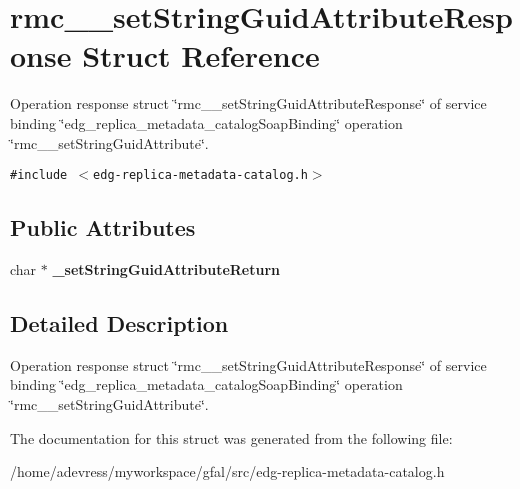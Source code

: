 \section{rmc\_\-\_\-set\-String\-Guid\-Attribute\-Response Struct Reference}
\label{structrmc____setStringGuidAttributeResponse}
Operation response struct \char`\"{}rmc\_\-\_\-set\-String\-Guid\-Attribute\-Response\char`\"{} of service binding \char`\"{}edg\_\-replica\_\-metadata\_\-catalog\-Soap\-Binding\char`\"{} operation \char`\"{}rmc\_\-\_\-set\-String\-Guid\-Attribute\char`\"{}.  


{\tt \#include $<$edg-replica-metadata-catalog.h$>$}

\subsection*{Public Attributes}
\begin{CompactItemize}
\item 
char $\ast$ \textbf{\_\-set\-String\-Guid\-Attribute\-Return}\label{structrmc____setStringGuidAttributeResponse_dcee69ff9ba25e58e7a504fbbf7f0140}

\end{CompactItemize}


\subsection{Detailed Description}
Operation response struct \char`\"{}rmc\_\-\_\-set\-String\-Guid\-Attribute\-Response\char`\"{} of service binding \char`\"{}edg\_\-replica\_\-metadata\_\-catalog\-Soap\-Binding\char`\"{} operation \char`\"{}rmc\_\-\_\-set\-String\-Guid\-Attribute\char`\"{}. 



The documentation for this struct was generated from the following file:\begin{CompactItemize}
\item 
/home/adevress/myworkspace/gfal/src/edg-replica-metadata-catalog.h\end{CompactItemize}
